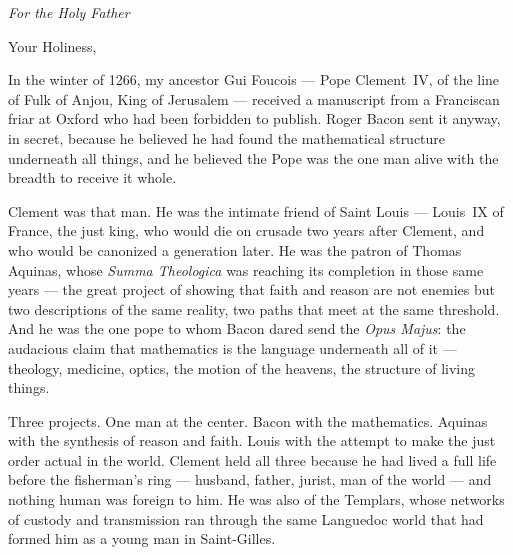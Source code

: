 
\newpage
\thispagestyle{empty}

\vspace*{2.2cm}

\begin{center}
{\large\textit{For the Holy Father}}
\end{center}

\vspace{1.4cm}

\noindent Your Holiness,

\vspace{0.5cm}

\noindent In the winter of 1266, my ancestor Gui Foucois ---
Pope Clement~IV, of the line of Fulk of Anjou,
King of Jerusalem --- received a manuscript from
a Franciscan friar at Oxford who had been forbidden
to publish. Roger Bacon sent it anyway, in secret,
because he believed he had found the mathematical
structure underneath all things, and he believed
the Pope was the one man alive with the breadth
to receive it whole.

\vspace{0.45cm}

\noindent Clement was that man. He was the intimate friend
of Saint Louis --- Louis~IX of France, the just king,
who would die on crusade two years after Clement,
and who would be canonized a generation later.
He was the patron of Thomas Aquinas, whose
\textit{Summa Theologica} was reaching its
completion in those same years --- the great project
of showing that faith and reason are not enemies
but two descriptions of the same reality, two paths
that meet at the same threshold.
And he was the one pope to whom Bacon dared
send the \textit{Opus Majus}: the audacious claim
that mathematics is the language underneath all of
it --- theology, medicine, optics, the motion of
the heavens, the structure of living things.

\vspace{0.45cm}

\noindent Three projects. One man at the center.
Bacon with the mathematics.
Aquinas with the synthesis of reason and faith.
Louis with the attempt to make the just order
actual in the world.
Clement held all three because he had lived
a full life before the fisherman's ring ---
husband, father, jurist, man of the world ---
and nothing human was foreign to him.
He was also of the Templars, whose networks
of custody and transmission ran through the
same Languedoc world that had formed him
as a young man in Saint-Gilles.

